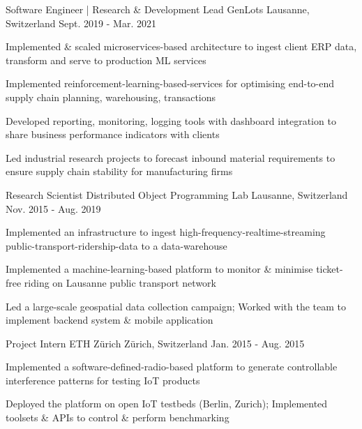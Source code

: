 \begin{cventries}
  \cventry
    {Software Engineer | Research \& Development Lead} %
    {GenLots} %
    {Lausanne, Switzerland} %
    {Sept. 2019 - Mar. 2021} %
    {
      \begin{cvitems} %
        \item {Implemented \& scaled microservices-based architecture to ingest client ERP data, transform and serve to production ML services}
      	\item {Implemented reinforcement-learning-based-services for optimising end-to-end supply chain planning, warehousing, transactions}
        \item {Developed reporting, monitoring, logging tools with dashboard integration to share business performance indicators with clients}
        \item {Led industrial research projects to forecast inbound material requirements to ensure supply chain stability for manufacturing firms}
      \end{cvitems}
    } 
   

  \cventry
    {Research Scientist} %
    {Distributed Object Programming Lab} %
    {Lausanne, Switzerland} %
    {Nov. 2015 - Aug. 2019} %
    {
      \begin{cvitems} %
      	\item {Implemented an infrastructure to ingest high-frequency-realtime-streaming public-transport-ridership-data to a data-warehouse}
      	\item {Implemented a machine-learning-based platform to monitor \& minimise ticket-free riding on Lausanne public transport network}
        \item {Led a large-scale geospatial data collection campaign; Worked with the team to implement backend system \& mobile application}
      \end{cvitems}
    }


  \cventry
    {Project Intern} %
    {ETH Zürich} %
    {Zürich, Switzerland} %
    {Jan. 2015 - Aug. 2015} %
    {
      \begin{cvitems} %
      	\item {Implemented a software-defined-radio-based platform to generate controllable interference patterns for testing IoT products}
        \item {Deployed the platform on open IoT testbeds (Berlin, Zurich); Implemented toolsets \& APIs to control \& perform benchmarking}
      \end{cvitems}
    }


\end{cventries}
